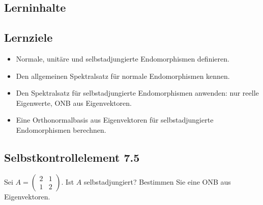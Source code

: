 \documentclass[a4paper,12pt]{article}
\begin{document}
\subsection*{Lerninhalte}
\begin{center}
\end{center}

\subsection*{Lernziele}
\begin{itemize}
  \item Normale, unitäre und selbstadjungierte Endomorphismen definieren.
  \item Den allgemeinen Spektralsatz für normale Endomorphismen kennen.
  \item Den Spektralsatz für selbstadjungierte Endomorphismen anwenden: nur reelle Eigenwerte, ONB aus Eigenvektoren.
  \item Eine Orthonormalbasis aus Eigenvektoren für selbstadjungierte Endomorphismen berechnen.
\end{itemize}

\subsection*{Selbstkontrollelement 7.5}
Sei $A = \begin{pmatrix}2&1\\1&2\end{pmatrix}$. Ist $A$ selbstadjungiert? Bestimmen Sie eine ONB aus Eigenvektoren.
\end{document}
